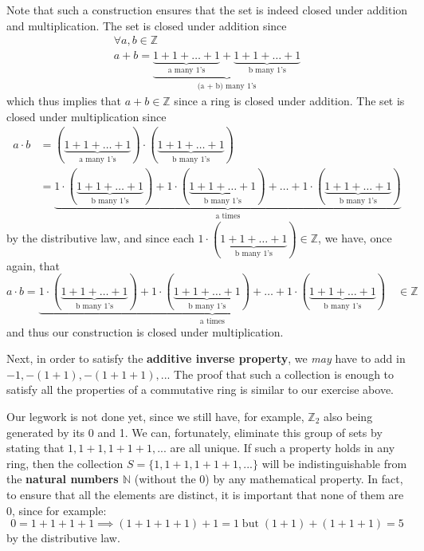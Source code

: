 \documentclass[11pt, oneside]{book}
\theoremstyle{break}
\newcommand{\bb}[1]{\mathbb{#1}}			%
\begin{document}
Note that such a construction ensures that the set is indeed closed under addition and multiplication. The set is closed under addition since
\begin{gather*}
	\forall a, b \in \bb{Z} \\
	a + b = \underbrace{\underbrace{1 + 1 + \hdots + 1}_\text{a many 1's} + \underbrace{1 + 1 + \hdots + 1}_\text{b many 1's}}_\text{(a + b) many 1's}
\end{gather*}
which thus implies that $a + b \in \bb{Z}$ since a ring is closed under addition. The set is closed under multiplication since
\begin{align*}
	a \cdot b &= (\underbrace{1 + 1 + \hdots + 1}_\text{a many 1's}) \cdot (\underbrace{1 + 1 + \hdots + 1}_\text{b many 1's}) \\
			  &= \underbrace{1 \cdot (\underbrace{1 + 1 + \hdots + 1}_\text{b many 1's}) + 1 \cdot (\underbrace{1 + 1 + \hdots + 1}_\text{b many 1's}) + \hdots + 1 \cdot (\underbrace{1 + 1 + \hdots + 1}_\text{b many 1's})}_\text{a times}
\end{align*}
by the distributive law, and since each $1 \cdot (\underbrace{1 + 1 + \hdots + 1}_\text{b many 1's}) \in \bb{Z}$, we have, once again, that
\begin{equation*}
	a \cdot b = \underbrace{1 \cdot (\underbrace{1 + 1 + \hdots + 1}_\text{b many 1's}) + 1 \cdot (\underbrace{1 + 1 + \hdots + 1}_\text{b many 1's}) + \hdots + 1 \cdot (\underbrace{1 + 1 + \hdots + 1}_\text{b many 1's})}_\text{a times} \quad \in \bb{Z}
\end{equation*}
and thus our construction is closed under multiplication.

Next, in order to satisfy the \textbf{additive inverse property}, we \textit{may} have to add in $-1, -(1 + 1), -(1 + 1 + 1), ...$ The proof that such a collection is enough to satisfy all the properties of a commutative ring is similar to our exercise above.

Our legwork is not done yet, since we still have, for example, $\bb{Z}_2$ also being generated by its 0 and 1. We can, fortunately, eliminate this group of sets by stating that $1, 1 + 1, 1 + 1 + 1, ...$ are all unique. If such a property holds in any ring, then the collection $S = \{1, 1 + 1, 1 + 1 + 1, ...\}$ will be indistinguishable from the \textbf{natural numbers $\bb{N}$} (without the 0) by any mathematical property. In fact, to ensure that all the elements are distinct, it is important that none of them are 0, since for example:
\begin{equation*}
	0 = 1 + 1 + 1 + 1 \implies (1 + 1 + 1 + 1) + 1 = 1 \; \text{but} \; (1 + 1) + (1 + 1 + 1) = 5
\end{equation*}
by the distributive law.
\end{document}

